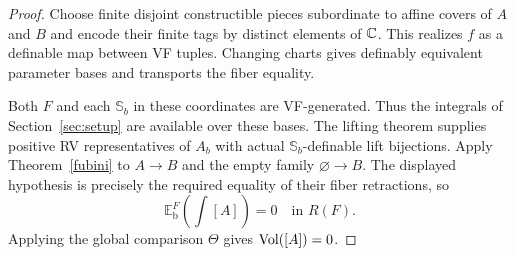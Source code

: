 \begin{proof}
Choose finite disjoint constructible pieces subordinate to
affine covers of $A$ and $B$ and encode their finite tags
by distinct elements of $\mathbb C$.
This realizes $f$ as a definable map between VF tuples.
Changing charts gives definably equivalent parameter
bases and transports the fiber equality.

Both $F$ and each $\mathbb S_b$ in these coordinates are
VF-generated. Thus the integrals of Section~\ref{sec:setup} are
available over these bases.
The lifting theorem supplies positive RV representatives
of $A_b$ with actual $\mathbb S_b$-definable lift bijections.
Apply Theorem~\ref{fubini} to $A\to B$ and the empty family
$\varnothing\to B$.
The displayed hypothesis is precisely the required
equality of their fiber retractions, so
\[
 \mathbb E_{\mathrm b}^{F}\!
       \left(\int[A]\right)=0
       \quad\text{in }R(F).
\]
Applying the global comparison $\Theta$ gives
$\operatorname{Vol}([A])=0$.
\end{proof}
